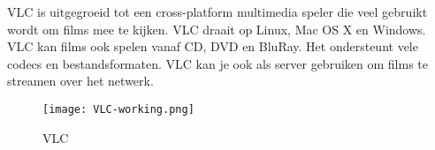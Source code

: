 VLC is uitgegroeid tot een cross-platform multimedia speler die veel gebruikt wordt om films mee te kijken. VLC draait op Linux, Mac OS X en Windows. VLC kan films ook spelen vanaf CD, DVD en BluRay. Het ondersteunt vele codecs en bestandsformaten. VLC kan je ook als server gebruiken om films te streamen over het netwerk.

\begin{center}
\begin{figure}[H]
\texttt{[image: VLC-working.png]}
\caption{VLC}
\end{figure}
\end{center}
